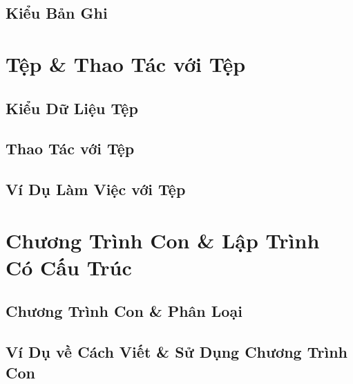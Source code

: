 \documentclass[oneside]{book}
\numberwithin{equation}{section}
\begin{document}

\section{Kiểu Bản Ghi}


\chapter{Tệp \& Thao Tác với Tệp}

\section{Kiểu Dữ Liệu Tệp}


\section{Thao Tác với Tệp}


\section{Ví Dụ Làm Việc với Tệp}


\chapter{Chương Trình Con \& Lập Trình Có Cấu Trúc}

\section{Chương Trình Con \& Phân Loại}


\section{Ví Dụ về Cách Viết \& Sử Dụng Chương Trình Con}
\end{document}
